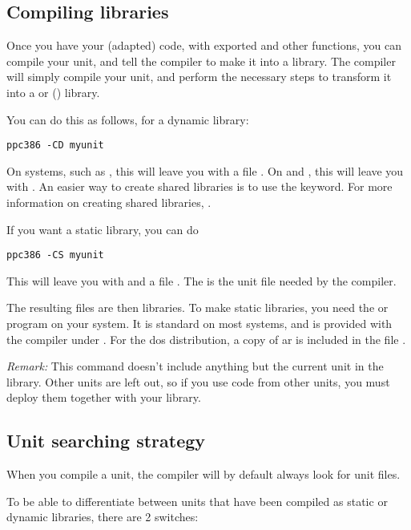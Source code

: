 \subsection {Compiling libraries}

Once you have your (adapted) code, with exported and other functions,
you can compile your unit, and tell the compiler to make it into a library.
The compiler will simply compile your unit, and perform the necessary steps
to transform it into a  or  () library.

You can do this as follows, for a dynamic library:
\begin{verbatim}
ppc386 -CD myunit
\end{verbatim}
On \unix systems, such as \linux, this will leave you with a file . On \windows
and \ostwo, this will leave you with . An easier way to
create shared libraries is to use the  keyword. For more
information on creating shared libraries, .

If you want a static library, you can do
\begin{verbatim}
ppc386 -CS myunit
\end{verbatim}
This will leave you with  and a file .
The  is the unit file needed by the \fpc compiler.

The resulting files are then libraries. To make static libraries, you need
the  or  program on your system. It is standard on most
\unix systems, and is provided with the  compiler under \dos.
For the dos distribution, a copy of ar is included in the file
.

{\em Remark:} This command doesn't include anything but the current unit in
the library. Other units are left out, so if you use code from other units,
you must deploy them together with your library.


\subsection{Unit searching strategy}

When you compile a unit, the compiler will by
default always look for unit files.

To be able to differentiate between units that have been compiled as static
or dynamic libraries, there are 2 switches:

